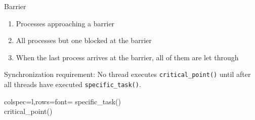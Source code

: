 \begin{frame}{Barrier}
  \begin{center}
  \end{center}
  \begin{enumerate}
  \item Processes approaching a barrier
  \item All processes but one blocked at the barrier
  \item When the last process arrives at the barrier, all of them are let through
  \end{enumerate}
  \begin{minipage}{.7\linewidth}
    \begin{block}{Synchronization requirement:}
      No thread executes \texttt{critical\_point()} until after all threads have executed
      \texttt{specific\_task()}.
    \end{block}
  \end{minipage}\quad
  \begin{minipage}{.25\linewidth}
    \begin{tblr}{colspec={l},rows={font=\ttfamily}}
      {specific\_task()\\critical\_point()}
    \end{tblr}
  \end{minipage}
\end{frame}

